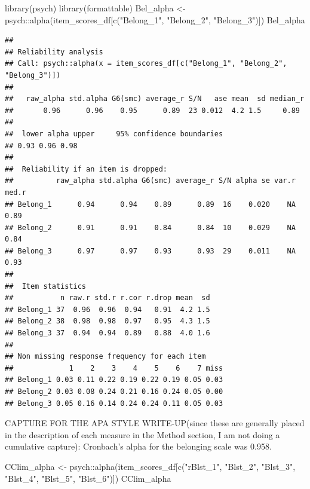 \documentclass[
  english,
]{book}
\newenvironment{Shaded}{\begin{snugshade}}{\end{snugshade}}
\newcommand{\FunctionTok}[1]{\textcolor[rgb]{0.00,0.00,0.00}{#1}}
\newcommand{\NormalTok}[1]{#1}
\newcommand{\OtherTok}[1]{\textcolor[rgb]{0.56,0.35,0.01}{#1}}
\newcommand{\SpecialCharTok}[1]{\textcolor[rgb]{0.00,0.00,0.00}{#1}}
\newcommand{\StringTok}[1]{\textcolor[rgb]{0.31,0.60,0.02}{#1}}
\begin{document}
\begin{Shaded}
\begin{Highlighting}[]
\FunctionTok{library}\NormalTok{(psych)}
\FunctionTok{library}\NormalTok{(formattable)}
\NormalTok{Bel\_alpha }\OtherTok{\textless{}{-}}\NormalTok{ psych}\SpecialCharTok{::}\FunctionTok{alpha}\NormalTok{(item\_scores\_df[}\FunctionTok{c}\NormalTok{(}\StringTok{"Belong\_1"}\NormalTok{, }\StringTok{"Belong\_2"}\NormalTok{, }\StringTok{"Belong\_3"}\NormalTok{)])}
\NormalTok{Bel\_alpha}
\end{Highlighting}
\end{Shaded}

\begin{verbatim}
## 
## Reliability analysis   
## Call: psych::alpha(x = item_scores_df[c("Belong_1", "Belong_2", "Belong_3")])
## 
##   raw_alpha std.alpha G6(smc) average_r S/N   ase mean  sd median_r
##       0.96      0.96    0.95      0.89  23 0.012  4.2 1.5     0.89
## 
##  lower alpha upper     95% confidence boundaries
## 0.93 0.96 0.98 
## 
##  Reliability if an item is dropped:
##          raw_alpha std.alpha G6(smc) average_r S/N alpha se var.r med.r
## Belong_1      0.94      0.94    0.89      0.89  16    0.020    NA  0.89
## Belong_2      0.91      0.91    0.84      0.84  10    0.029    NA  0.84
## Belong_3      0.97      0.97    0.93      0.93  29    0.011    NA  0.93
## 
##  Item statistics 
##           n raw.r std.r r.cor r.drop mean  sd
## Belong_1 37  0.96  0.96  0.94   0.91  4.2 1.5
## Belong_2 38  0.98  0.98  0.97   0.95  4.3 1.5
## Belong_3 37  0.94  0.94  0.89   0.88  4.0 1.6
## 
## Non missing response frequency for each item
##             1    2    3    4    5    6    7 miss
## Belong_1 0.03 0.11 0.22 0.19 0.22 0.19 0.05 0.03
## Belong_2 0.03 0.08 0.24 0.21 0.16 0.24 0.05 0.00
## Belong_3 0.05 0.16 0.14 0.24 0.24 0.11 0.05 0.03
\end{verbatim}

CAPTURE FOR THE APA STYLE WRITE-UP(since these are generally placed in the description of each measure in the Method section, I am not doing a cumulative capture): Cronbach's alpha for the belonging scale was 0.958.

\begin{Shaded}
\begin{Highlighting}[]
\NormalTok{CClim\_alpha }\OtherTok{\textless{}{-}}\NormalTok{ psych}\SpecialCharTok{::}\FunctionTok{alpha}\NormalTok{(item\_scores\_df[}\FunctionTok{c}\NormalTok{(}\StringTok{"rBlst\_1"}\NormalTok{, }\StringTok{"Blst\_2"}\NormalTok{, }\StringTok{"Blst\_3"}\NormalTok{, }\StringTok{"Blst\_4"}\NormalTok{, }\StringTok{"Blst\_5"}\NormalTok{, }\StringTok{"Blst\_6"}\NormalTok{)])}
\NormalTok{CClim\_alpha}
\end{Highlighting}
\end{Shaded}
\end{document}
